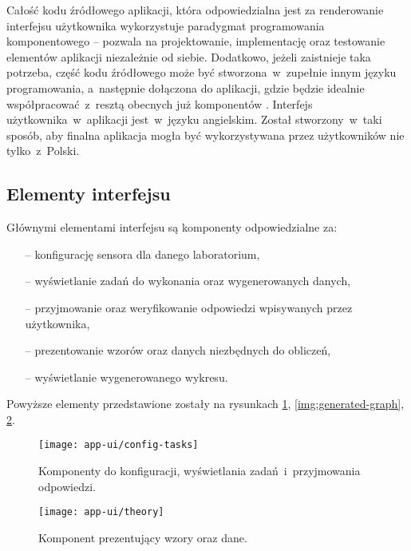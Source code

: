 Całość kodu źródłowego aplikacji, która odpowiedzialna jest za renderowanie interfejsu użytkownika
wykorzystuje paradygmat programowania komponentowego -- pozwala na projektowanie, implementację oraz
testowanie elementów aplikacji niezależnie od siebie. Dodatkowo, jeżeli zaistnieje taka potrzeba,
część kodu źródłowego może być stworzona~w~zupełnie innym języku programowania, a~następnie
dołączona do aplikacji, gdzie będzie idealnie współpracować~z~resztą obecnych już komponentów
\cite{component-programming}. Interfejs użytkownika~w~aplikacji jest~w~języku angielskim. Został
stworzony~w~taki sposób, aby finalna aplikacja mogła być wykorzystywana przez użytkowników nie
tylko~z~Polski.

\subsection{Elementy interfejsu}
Głównymi elementami interfejsu są komponenty odpowiedzialne za:
\begin{itemize}
  \item[--] konfigurację sensora dla danego laboratorium,
  \item[--] wyświetlanie zadań do wykonania oraz wygenerowanych danych,
  \item[--] przyjmowanie oraz weryfikowanie odpowiedzi wpisywanych przez użytkownika,
  \item[--] prezentowanie wzorów oraz danych niezbędnych do obliczeń,
  \item[--] wyświetlanie wygenerowanego wykresu.
\end{itemize}
Powyższe elementy przedstawione zostały na rysunkach \ref{img:config-tasks},
\ref{img:generated-graph}, \ref{img:theory}.

\begingroup
\begin{figure}[!htb]
  \centering
  \texttt{[image: app-ui/config-tasks]}
  \caption{\label{img:config-tasks}Komponenty do konfiguracji, wyświetlania zadań~i~przyjmowania
    odpowiedzi.}
\end{figure}

\begin{figure}[!htb]
  \centering
  \texttt{[image: app-ui/theory]}
  \caption{\label{img:theory}Komponent prezentujący wzory oraz dane.}
\end{figure}

